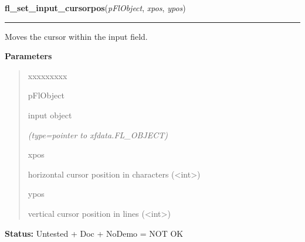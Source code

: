 \hspace{.8\funcindent}\begin{boxedminipage}{\funcwidth}

    \raggedright \textbf{fl\_set\_input\_cursorpos}(\textit{pFlObject}, \textit{xpos}, \textit{ypos})

    \vspace{-1.5ex}

    \rule{\textwidth}{0.5\fboxrule}
\setlength{\parskip}{2ex}
    Moves the cursor within the input field.

\setlength{\parskip}{1ex}
      \textbf{Parameters}
      \vspace{-1ex}

      \begin{quote}
        \begin{Ventry}{xxxxxxxxx}

          \item[pFlObject]

          input object

            {\it (type=pointer to xfdata.FL\_OBJECT)}

          \item[xpos]

          horizontal cursor position in characters 
          ({\textless}int{\textgreater})

          \item[ypos]

          vertical cursor position in lines ({\textless}int{\textgreater})

        \end{Ventry}

      \end{quote}

\textbf{Status:} Untested + Doc + NoDemo = NOT OK



    \end{boxedminipage}

    \label{xformslib:flinput:fl_set_input_selected}

    \vspace{0.5ex}

